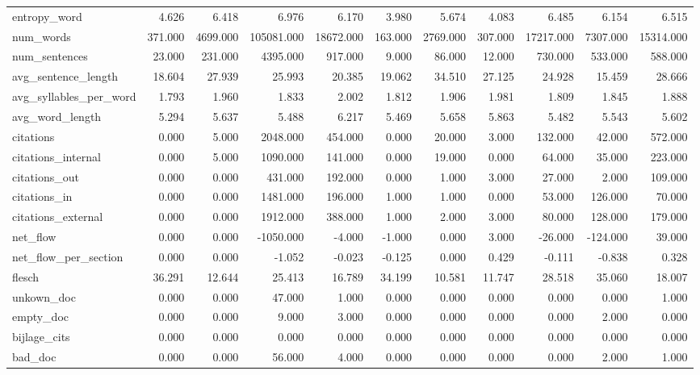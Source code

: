 \begin{tabular}{lrrrrrrrrrr}
\cline{1-11}
entropy\_word & 4.626 & 6.418 & 6.976 & 6.170 & 3.980 & 5.674 & 4.083 & 6.485 & 6.154 & 6.515 \\
\cline{1-11}
num\_words & 371.000 & 4699.000 & 105081.000 & 18672.000 & 163.000 & 2769.000 & 307.000 & 17217.000 & 7307.000 & 15314.000 \\
\cline{1-11}
num\_sentences & 23.000 & 231.000 & 4395.000 & 917.000 & 9.000 & 86.000 & 12.000 & 730.000 & 533.000 & 588.000 \\
\cline{1-11}
avg\_sentence\_length & 18.604 & 27.939 & 25.993 & 20.385 & 19.062 & 34.510 & 27.125 & 24.928 & 15.459 & 28.666 \\
\cline{1-11}
avg\_syllables\_per\_word & 1.793 & 1.960 & 1.833 & 2.002 & 1.812 & 1.906 & 1.981 & 1.809 & 1.845 & 1.888 \\
\cline{1-11}
avg\_word\_length & 5.294 & 5.637 & 5.488 & 6.217 & 5.469 & 5.658 & 5.863 & 5.482 & 5.543 & 5.602 \\
\cline{1-11}
citations & 0.000 & 5.000 & 2048.000 & 454.000 & 0.000 & 20.000 & 3.000 & 132.000 & 42.000 & 572.000 \\
\cline{1-11}
citations\_internal & 0.000 & 5.000 & 1090.000 & 141.000 & 0.000 & 19.000 & 0.000 & 64.000 & 35.000 & 223.000 \\
\cline{1-11}
citations\_out & 0.000 & 0.000 & 431.000 & 192.000 & 0.000 & 1.000 & 3.000 & 27.000 & 2.000 & 109.000 \\
\cline{1-11}
citations\_in & 0.000 & 0.000 & 1481.000 & 196.000 & 1.000 & 1.000 & 0.000 & 53.000 & 126.000 & 70.000 \\
\cline{1-11}
citations\_external & 0.000 & 0.000 & 1912.000 & 388.000 & 1.000 & 2.000 & 3.000 & 80.000 & 128.000 & 179.000 \\
\cline{1-11}
net\_flow & 0.000 & 0.000 & -1050.000 & -4.000 & -1.000 & 0.000 & 3.000 & -26.000 & -124.000 & 39.000 \\
\cline{1-11}
net\_flow\_per\_section & 0.000 & 0.000 & -1.052 & -0.023 & -0.125 & 0.000 & 0.429 & -0.111 & -0.838 & 0.328 \\
\cline{1-11}
flesch & 36.291 & 12.644 & 25.413 & 16.789 & 34.199 & 10.581 & 11.747 & 28.518 & 35.060 & 18.007 \\
\cline{1-11}
unkown\_doc & 0.000 & 0.000 & 47.000 & 1.000 & 0.000 & 0.000 & 0.000 & 0.000 & 0.000 & 1.000 \\
\cline{1-11}
empty\_doc & 0.000 & 0.000 & 9.000 & 3.000 & 0.000 & 0.000 & 0.000 & 0.000 & 2.000 & 0.000 \\
\cline{1-11}
bijlage\_cits & 0.000 & 0.000 & 0.000 & 0.000 & 0.000 & 0.000 & 0.000 & 0.000 & 0.000 & 0.000 \\
\cline{1-11}
bad\_doc & 0.000 & 0.000 & 56.000 & 4.000 & 0.000 & 0.000 & 0.000 & 0.000 & 2.000 & 1.000 \\
\cline{1-11}
\bottomrule
\end{tabular}
